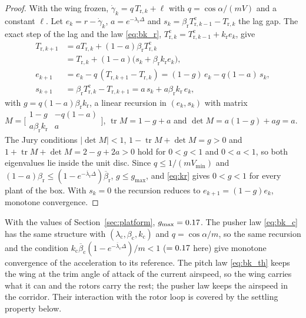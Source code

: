 \begin{proof}
With the wing frozen, $\dot\gamma_k=q\,T_{\mathrm r,k}+\ell$ with $q=\cos\alpha/(mV)$ and a constant $\ell$. Let $e_k=r-\dot\gamma_k$, $a=e^{-\lambda_{\mathrm r}\Delta}$ and $s_k=\beta_{\mathrm r}T^{\mathrm c}_{\mathrm r,k-1}-T_{\mathrm r,k}$ the lag gap. The exact step of the lag and the law \eqref{eq:bk_r}, $T^{\mathrm c}_{\mathrm r,k}=T^{\mathrm c}_{\mathrm r,k-1}+k_{\mathrm r}e_k$, give
\begin{align}
T_{\mathrm r,k+1}&=aT_{\mathrm r,k}+(1-a)\beta_{\mathrm r}T^{\mathrm c}_{\mathrm r,k}\nonumber\\ &=T_{\mathrm r,k}+(1-a)\big(s_k+\beta_{\mathrm r}k_{\mathrm r}e_k\big),\\
e_{k+1}&=e_k-q\,(T_{\mathrm r,k+1}-T_{\mathrm r,k})=(1-g)\,e_k-q(1-a)\,s_k,\nonumber\\
s_{k+1}&=\beta_{\mathrm r}T^{\mathrm c}_{\mathrm r,k}-T_{\mathrm r,k+1}=a\,s_k+a\beta_{\mathrm r}k_{\mathrm r}\,e_k,
\end{align}
with $g=q(1-a)\beta_{\mathrm r}k_{\mathrm r}$, a linear recursion in $(e_k,s_k)$ with matrix $M=\big[\begin{smallmatrix}1-g&-q(1-a)\\ a\beta_{\mathrm r}k_{\mathrm r}&a\end{smallmatrix}\big]$, $\operatorname{tr}M=1-g+a$ and $\det M=a(1-g)+a g=a$. The Jury conditions $|\det M|<1$, $1-\operatorname{tr}M+\det M=g>0$ and $1+\operatorname{tr}M+\det M=2-g+2a>0$ hold for $0<g<1$ and $0<a<1$, so both eigenvalues lie inside the unit disc. Since $q\le1/(mV_{\min})$ and $(1-a)\beta_{\mathrm r}\le(1-e^{-\overline\lambda_{\mathrm r}\Delta})\overline\beta_{\mathrm r}$, $g\le g_{\max}$, and \eqref{eq:kr} gives $0<g<1$ for every plant of the box. With $s_k=0$ the recursion reduces to $e_{k+1}=(1-g)e_k$, monotone convergence.
\end{proof}
\noindent With the values of Section~\ref{sec:platform}, $g_{\max}=0.17{}$. The pusher law \eqref{eq:bk_c} has the same structure with $(\lambda_{\mathrm c},\beta_{\mathrm c},k_{\mathrm c})$ and $q=\cos\alpha/m$, so the same recursion and the condition $k_{\mathrm c}\overline\beta_{\mathrm c}(1-e^{-\overline\lambda_{\mathrm c}\Delta})/m<1$ ($=0.17{}$ here) give monotone convergence of the acceleration to its reference. The pitch law \eqref{eq:bk_th} keeps the wing at the trim angle of attack of the current airspeed, so the wing carries what it can and the rotors carry the rest; the pusher law keeps the airspeed in the corridor. Their interaction with the rotor loop is covered by the settling property below.

